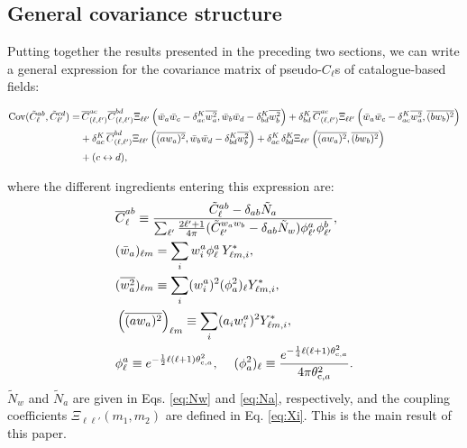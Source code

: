 \documentclass[%
 reprint,
superscriptaddress,
nofootinbib,
 amsmath,amssymb,
 aps,
 prd,
]{revtex4-2}
\begin{document}
  \subsection{General covariance structure}\label{ssec:theo.general}
    Putting together the results presented in the preceding two sections, we can write a general expression for the covariance matrix of pseudo-$C_\ell$s of catalogue-based fields:
    \begin{widetext}
    \begin{align}\nonumber
      {\rm Cov}(\tilde{C}^{ab}_\ell,\tilde{C}^{cd}_{\ell'})
      =&\,\overline{C}^{ac}_{(\ell,\ell')}\overline{C}^{bd}_{(\ell,\ell')}\Xi_{\ell\ell'}\left(\bar{w}_a\bar{w}_c-\delta^K_{ac}\overline{w_a^2},\bar{w}_b\bar{w}_d-\delta^K_{bd}\overline{w_b^2}\right)+\delta^K_{bd}\,\overline{C}^{ac}_{(\ell,\ell')}\Xi_{\ell\ell'}\left(\bar{w}_a\bar{w}_c-\delta^K_{ac}\overline{w_a^2},\overline{(bw_b)^2}\right)\\\label{eq:main_result}
      &+\delta^K_{ac}\,\overline{C}^{bd}_{(\ell,\ell')}\Xi_{\ell\ell'}\left(\overline{(aw_a)^2},\bar{w}_b\bar{w}_d-\delta^K_{bd}\overline{w_b^2}\right)+\delta^K_{ac}\,\delta^K_{bd}\Xi_{\ell\ell'}\left(\overline{(aw_a)^2},\overline{(bw_b)^2}\right)\\\nonumber
      &+(c\leftrightarrow d),
    \end{align}
    \end{widetext}
    where the different ingredients entering this expression are:
    \begin{align}\label{eq:inka_cell_final}
      &\overline{C}^{ab}_\ell\equiv\frac{\tilde{C}^{ab}_\ell-\delta_{ab}\tilde{N}_a}{\sum_{\ell'}\frac{2\ell'+1}{4\pi}(\tilde{C}^{w_aw_b}_{\ell'}-\delta_{ab}\tilde{N}_w)\phi^a_{\ell'}\phi^b_{\ell'}},\\
      &(\bar{w}_a)_{\ell m}=\sum_iw^a_i\phi^a_\ell\,Y^*_{\ell m,i},\\
      &(\overline{w_a^2})_{\ell m}\equiv\sum_i(w^a_i)^2(\phi^2_a)_\ell Y^*_{\ell m,i},\\\label{eq:awa2}
      &\left(\overline{(aw_a)^2}\right)_{\ell m}\equiv\sum_i(a_iw^a_i)^2Y_{\ell m,i}^*,\\
      &\phi^a_\ell\equiv e^{-\frac{1}{2}\ell(\ell+1)\theta^2_{{\rm c},a}},
      \hspace{12pt}(\phi^2_a)_\ell\equiv\frac{e^{-\frac{1}{4}\ell(\ell+1)\theta^2_{{\rm c},a}}}{4\pi\theta^2_{{\rm c},a}}.
    \end{align}
    $\tilde{N}_w$ and $\tilde{N}_a$ are given in Eqs. \ref{eq:Nw} and \ref{eq:Na}, respectively, and the coupling coefficients $\Xi_{\ell\ell'}(m_1,m_2)$ are defined in Eq. \ref{eq:Xi}. This is the main result of this paper.
\end{document}
